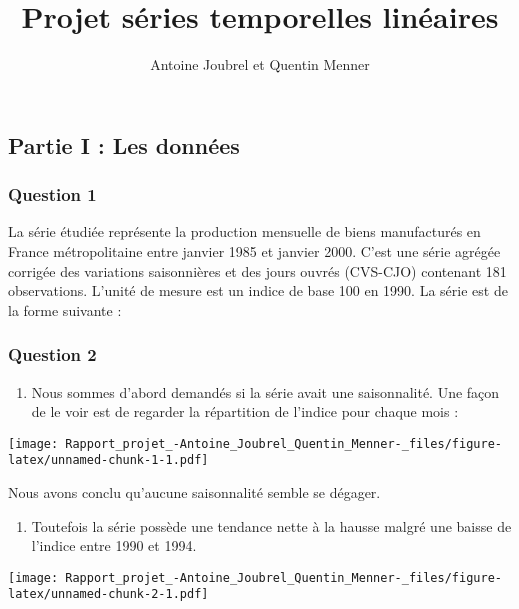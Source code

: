 \documentclass[
  landscape]{article}
\title{Projet séries temporelles linéaires}
\author{Antoine Joubrel et Quentin Menner}
\date{}
\providecommand{\tightlist}{%
  \setlength{\itemsep}{0pt}\setlength{\parskip}{0pt}}
\begin{document}
\maketitle

{
\setcounter{tocdepth}{2}
\tableofcontents
}
\hypertarget{partie-i-les-donnuxe9es}{%
\subsection{Partie I : Les données}\label{partie-i-les-donnuxe9es}}

\hypertarget{question-1}{%
\subsubsection{Question 1}\label{question-1}}

La série étudiée représente la production mensuelle de biens
manufacturés en France métropolitaine entre janvier 1985 et janvier
2000. C'est une série agrégée corrigée des variations saisonnières et
des jours ouvrés (CVS-CJO) contenant 181 observations. L'unité de mesure
est un indice de base 100 en 1990. La série est de la forme suivante :

\hypertarget{question-2}{%
\subsubsection{Question 2}\label{question-2}}

\begin{enumerate}
\def\labelenumi{\alph{enumi})}
\tightlist
\item
  Nous sommes d'abord demandés si la série avait une saisonnalité. Une
  façon de le voir est de regarder la répartition de l'indice pour
  chaque mois :
\end{enumerate}

\texttt{[image: Rapport\_projet\_-Antoine\_Joubrel\_Quentin\_Menner-\_files/figure-latex/unnamed-chunk-1-1.pdf]}

Nous avons conclu qu'aucune saisonnalité semble se dégager.

\begin{enumerate}
\def\labelenumi{\alph{enumi})}
\setcounter{enumi}{1}
\tightlist
\item
  Toutefois la série possède une tendance nette à la hausse malgré une
  baisse de l'indice entre 1990 et 1994.
\end{enumerate}

\texttt{[image: Rapport\_projet\_-Antoine\_Joubrel\_Quentin\_Menner-\_files/figure-latex/unnamed-chunk-2-1.pdf]}
\end{document}
